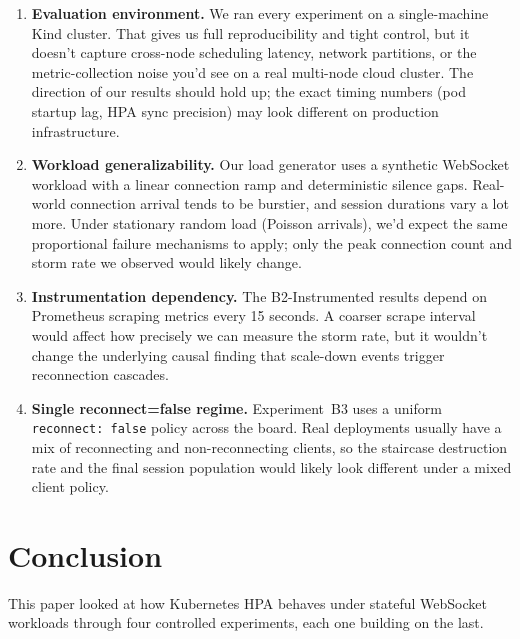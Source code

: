 \documentclass[twocolumn]{svjour3}
\begin{document}
\begin{enumerate}[leftmargin=*]

\item \textbf{Evaluation environment.} We ran every experiment on a single-machine
Kind cluster. That gives us full reproducibility and tight control, but it doesn't
capture cross-node scheduling latency, network partitions, or the metric-collection
noise you'd see on a real multi-node cloud cluster. The direction of our results
should hold up; the exact timing numbers (pod startup lag, HPA sync precision) may
look different on production infrastructure.

\item \textbf{Workload generalizability.} Our load generator uses a synthetic
WebSocket workload with a linear connection ramp and deterministic silence gaps.
Real-world connection arrival tends to be burstier, and session durations vary a
lot more. Under stationary random load (Poisson arrivals), we'd expect the same
proportional failure mechanisms to apply; only the peak connection count and storm
rate we observed would likely change.

\item \textbf{Instrumentation dependency.} The B2-Instrumented results depend on
Prometheus scraping metrics every 15 seconds. A coarser scrape interval would
affect how precisely we can measure the storm rate, but it wouldn't change the
underlying causal finding that scale-down events trigger reconnection cascades.

\item \textbf{Single reconnect=false regime.} Experiment~B3 uses a uniform
\texttt{reconnect: false} policy across the board. Real deployments usually have a
mix of reconnecting and non-reconnecting clients, so the staircase destruction rate
and the final session population would likely look different under a mixed
client policy.

\end{enumerate}



\section{Conclusion}
\label{sec:conclusion}

This paper looked at how Kubernetes HPA behaves under stateful WebSocket workloads
through four controlled experiments, each one building on the last.
\end{document}
